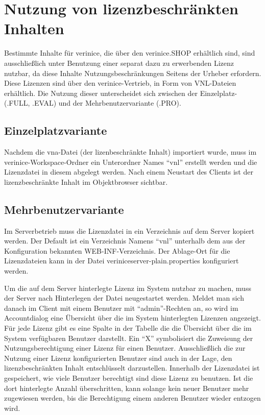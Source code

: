 \documentclass[a4paper,10pt]{book}
\begin{document}
\section{Nutzung von lizenzbeschränkten Inhalten} \label{sec:Nutzung von lizenzbeschränkten Inhalten}

Bestimmte Inhalte für verinice, die über den verinice.SHOP erhältlich sind, sind ausschließlich unter Benutzung einer separat dazu zu erwerbenden Lizenz nutzbar, da diese Inhalte Nutzungsbeschränkungen Seitens der Urheber erfordern. Diese Lizenzen sind über den verinice-Vertrieb, in Form von VNL-Dateien erhältlich. Die Nutzung dieser unterscheidet sich zwischen der Einzelplatz- (.FULL, .EVAL) und der Mehrbenutzervariante (.PRO).

\subsection{Einzelplatzvariante}

Nachdem die vna-Datei (der lizenbeschränkte Inhalt) importiert wurde, muss im verinice-Workspace-Ordner ein Unterordner Names ``vnl'' erstellt werden und die Lizenzdatei in diesem abgelegt werden. Nach einem Neustart des Clients ist der lizenzbeschränkte Inhalt im Objektbrowser sichtbar.

\subsection{Mehrbenutzervariante}

Im Serverbetrieb muss die Lizenzdatei in ein Verzeichnis auf dem Server kopiert werden. Der Default ist ein Verzeichnis Namens ``vnl'' unterhalb dem aus der Konfiguration bekannten WEB-INF-Verzeichnis. Der Ablage-Ort für die Lizenzdateien kann in der Datei veriniceserver-plain.properties konfiguriert werden.

Um die auf dem Server hinterlegte Lizenz im System nutzbar zu machen, muss der Server nach Hinterlegen der Datei neugestartet werden. Meldet man sich danach im Client mit einem Benutzer mit ``admin''-Rechten an, so wird im Accountdialog eine Übersicht über die im System hinterlegten Lizenzen angezeigt. Für jede Lizenz gibt es eine Spalte in der Tabelle die die Übersicht über die im System verfügbaren Benutzer darstellt. Ein ``X'' symbolisiert die Zuweisung der Nutzungsberechtigung einer Lizenz für einen Benutzer. Ausschließlich die zur Nutzung einer Lizenz konfigurierten Benutzer sind auch in der Lage, den lizenzbeschränkten Inhalt entschlüsselt darzustellen. Innerhalb der Lizenzdatei ist gespeichert, wie viele Benutzer berechtigt sind diese Lizenz zu benutzen. Ist die dort hinterlegte Anzahl überschritten, kann solange kein neuer Benutzer mehr zugewiesen werden, bis die Berechtigung einem anderen Benutzer wieder entzogen wird.
\end{document}
